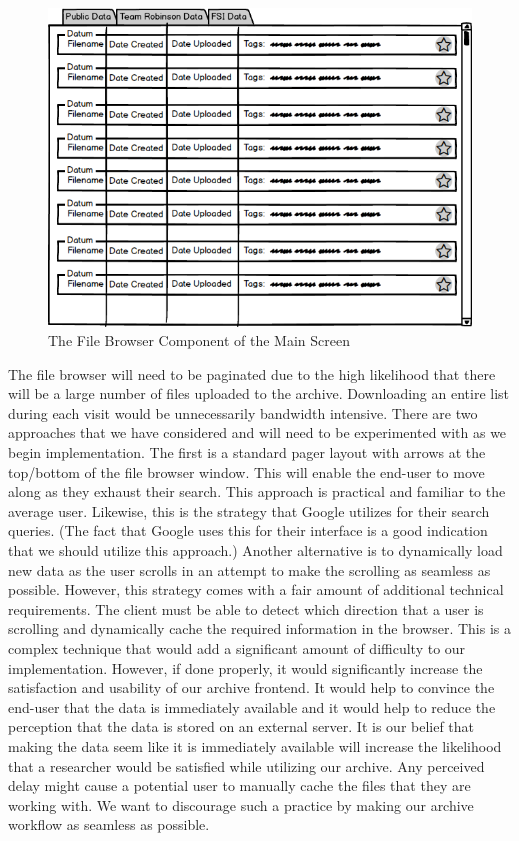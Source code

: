 \documentclass[12pt]{report}
\begin{document}
\begin{enumerate}
\begin{figure}[h]
	\centering
	\includegraphics[scale=0.5]{frontend_file_browser}
	\caption{The File Browser Component of the Main Screen}
	\label{fig:frontendfilebrowser}
\end{figure}

The file browser will need to be paginated due to the high likelihood that there will be a large number of files uploaded to the archive. Downloading an entire list during each visit would be unnecessarily bandwidth intensive. There are two approaches that we have considered and will need to be experimented with as we begin implementation. The first is a standard pager layout with arrows at the top/bottom of the file browser window. This will enable the end-user to move along as they exhaust their search. This approach is practical and familiar to the average user. Likewise, this is the strategy that Google utilizes for their search queries. (The fact that Google uses this for their interface is a good indication that we should utilize this approach.) Another alternative is to dynamically load new data as the user scrolls in an attempt to make the scrolling as seamless as possible. However, this strategy comes with a fair amount of additional technical requirements. The client must be able to detect which direction that a user is scrolling and dynamically cache the required information in the browser. This is a complex technique that would add a significant amount of difficulty to our implementation. However, if done properly, it would significantly increase the satisfaction and usability of our archive frontend. It would help to convince the end-user that the data is immediately available and it would help to reduce the perception that the data is stored on an external server. It is our belief that making the data seem like it is immediately available will increase the likelihood that a researcher would be satisfied while utilizing our archive. Any perceived delay might cause a potential user to manually cache the files that they are working with. We want to discourage such a practice by making our archive workflow as seamless as possible.


\end{enumerate}
\end{document}
